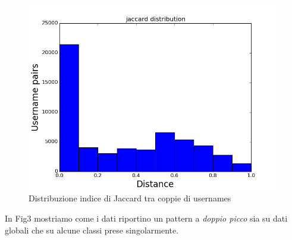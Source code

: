 \begin{figure}[h!]
\centering
\includegraphics[width=110mm]{chapters/distanceplot/jaccard_distribution.png}
\caption{Distribuzione indice di Jaccard tra coppie di usernames \label{overflow}}
\end{figure}

\newpage

In Fig3 mostriamo come i dati riportino un pattern a \textit{doppio picco} sia su dati globali che su alcune classi prese singolarmente.


